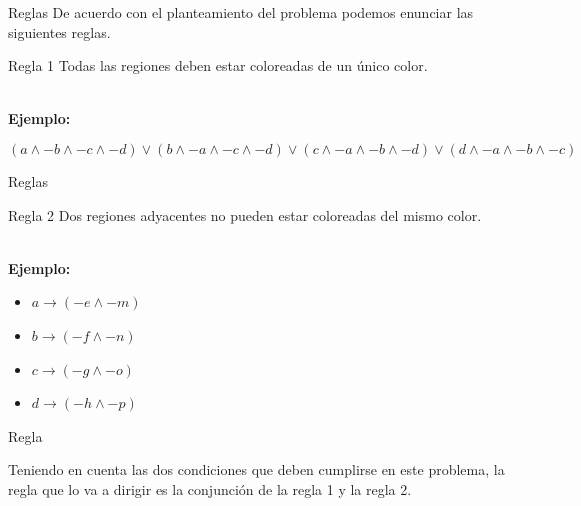 \documentclass[10pt]{beamer}
\begin{document}
\begin{frame}{Reglas}
De acuerdo con el planteamiento del problema podemos enunciar las siguientes reglas.
\begin{block}{Regla 1}
Todas las regiones deben estar coloreadas de un único color.
\end{block}
\textbf{\\ Ejemplo:}

$$(a \wedge -b \wedge -c \wedge -d) \lor (b \wedge -a \wedge -c \wedge -d) \lor (c \wedge -a \wedge -b \wedge -d) \lor (d \wedge -a \wedge -b \wedge -c)$$
 

\end{frame}

\begin{frame}{Reglas}
\begin{block}{Regla 2}
Dos regiones adyacentes no pueden estar coloreadas del mismo color. 
\end{block}
\textbf{\\ Ejemplo:}
\\
\begin{itemize}
\item $a \rightarrow (-e \wedge -m)$
\item $b \rightarrow (-f \wedge -n)$
\item $c \rightarrow (-g \wedge -o)$
\item $d \rightarrow (-h \wedge -p)$
\end{itemize}
\end{frame}

\begin{frame}{Regla}
\begin{block}{}
Teniendo en cuenta las dos condiciones que deben cumplirse en este problema, la regla que lo va a dirigir es la conjunción de la regla 1 y la regla 2. 
\end{block}
\end{frame}
\end{document}
